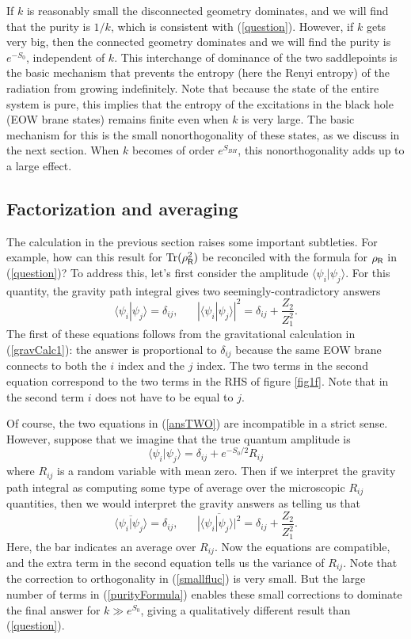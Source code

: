 \documentclass[11pt]{article}
\newcommand{\be}{\begin{equation}}
\newcommand{\ee}{\end{equation}}
\numberwithin{equation}{section}
\def\tr{\text{Tr}}
\begin{document}
If $k$ is reasonably small the disconnected geometry dominates, and we will find that the purity is $1/k$, which is consistent with (\ref{question}). However, if $k$ gets very big, then the connected geometry dominates and we will find the purity is $e^{-S_0}$, independent of $k$.   This interchange of dominance of the two saddlepoints  is the basic mechanism that prevents the entropy (here the Renyi entropy) of the radiation from growing indefinitely. Note that because the state of the entire system is pure, this implies that the entropy of the excitations in the black hole (EOW brane states) remains finite even when $k$ is very large. The basic mechanism for this is the small nonorthogonality of these states, as we discuss in the next section. When $k$ becomes of order $e^{S_{BH}}$, this nonorthogonality adds up to a large effect.


\subsection{Factorization and averaging}\label{sec:factorization and averaging}

The calculation in the previous section raises some important subtleties. For example, how can this result for $\tr(\rho_{\sf{R}}^2)$ be reconciled with the formula for $\rho_{\sf{R}}$ in (\ref{question})? To address this, let's first consider the amplitude $\langle \psi_i|\psi_j\rangle$. For this quantity, the gravity path integral gives two seemingly-contradictory answers
\be
\langle \psi_i|\psi_j\rangle = \delta_{ij},\hspace{20pt} |\langle \psi_{i}|\psi_j\rangle|^2 = \delta_{ij}+ \frac{Z_2}{Z_1^2}.\label{ansTWO}
\ee
The first of these equations follows from the gravitational calculation in (\ref{gravCalc1}): the answer is proportional to $\delta_{ij}$ because the same EOW brane connects to both the $i$ index and the $j$ index. The two terms in the second equation correspond to the two terms in the RHS of figure \ref{fig1f}. Note that in the second term $i$ does not have to be equal to $j$.

Of course, the two equations in (\ref{ansTWO}) are incompatible in a strict sense. However, suppose that we imagine that the true quantum amplitude is
\be\label{smallfluc}
\langle \psi_{i}|\psi_j\rangle = \delta_{ij} + e^{-S_0/2}R_{ij}
\ee
where $R_{ij}$ is a random variable with mean zero. Then if we interpret the gravity path integral as computing some type of average over the microscopic $R_{ij}$ quantities, then we would interpret the gravity answers as telling us that
\be
\overline{\langle \psi_i|\psi_j\rangle} = \delta_{ij}, \hspace{20pt} \overline{|\langle \psi_{i}|\psi_j\rangle|^2} = \delta_{ij}+ \frac{Z_2}{Z_1^2}.\label{amplitudes}
\ee
Here, the bar indicates an average over $R_{ij}$. Now the equations are compatible, and the extra term in the second equation tells us the variance of $R_{ij}$. Note that the correction to orthogonality in (\ref{smallfluc}) is very small.  But the large number of terms in  (\ref{purityFormula}) enables these small corrections to dominate the final answer for $k \gg e^{S_0}$, giving a qualitatively different result than (\ref{question}).
\end{document}
